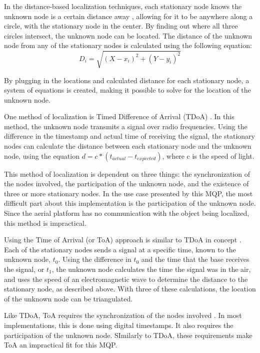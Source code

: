 In the distance-based localization techniques, each stationary node knows the unknown node is a certain distance away \cite{local_conf}, allowing for it to be anywhere along a circle, with the stationary node in the center. By finding out where all three circles intersect, the unknown node can be located. The distance of the unknown node from any of the stationary nodes is calculated using the following equation:
\[D_i =\sqrt{(X - x_i)^2 + (Y-y_i)^2}\]\par
By plugging in the locations and calculated distance for each stationary node, a system of equations is created, making it possible to solve for the location of the unknown node.\par
One method of localization is Timed Difference of Arrival (TDoA) \cite{local_conf}. In this method, the unknown node transmits a signal over radio frequencies. Using the difference in the timestamp and actual time of receiving the signal, the stationary nodes can calculate the distance between each stationary node and the unknown node, using the equation \( d = c*(t_{actual} - t_{expected}) \), where c is the speed of light. \par
This method of localization is dependent on three things: the synchronization of the nodes involved, the participation of the unknown node, and the existence of three or more stationary nodes. In the use case presented by this MQP, the most difficult part about this implementation is the participation of the unknown node. Since the aerial platform has no communication with the object being localized, this method is impractical. \par

Using the Time of Arrival (or ToA) approach is similar to TDoA in concept \cite{local_conf}. Each of the stationary nodes sends a signal at a specific time, known to the unknown node, $t_0$. Using the difference in $t_0$ and the time that the base receives the signal, or $t_1$, the unknown node calculates the time the signal was in the air, and uses the speed of an electromagnetic wave to determine the distance to the stationary node, as described above. With three of these calculations, the location of the unknown node can be triangulated.\par
Like TDoA, ToA requires the synchronization of the nodes involved \cite{local_conf}. In most implementations, this is done using digital timestamps. It also requires the participation of the unknown node. SImilarly to TDoA, these requirements make ToA an impractical fit for this MQP.

